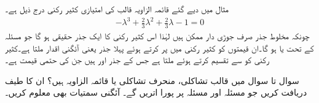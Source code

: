 مثال  میں دیے گئے قائمہ الزاویہ قالب کی امتیازی کثیر رکنی درج ذیل ہے۔
\begin{align*}
-\lambda^3+\frac{2}{3}\lambda^2+\frac{2}{3}\lambda-1=0
\end{align*} 
چونکہ مخلوط جذر صرف جوڑی دار ممکن ہیں لہٰذا اس کثیر رکنی کا ایک جذر حقیقی ہو گا جو مسئلہ  کے تحت  یا  ہو گا۔ان قیمتوں کو کثیر رکنی میں پر کرتے ہوئے پہلا جذر یعنی آئگنی اقدار  ملتا ہے۔کثیر رکنی کو  سے تقسیم کرتے ہوئے  ملتا ہے جس کے جذر   اور  ہیں جن کی حتمی قیمت  ہے۔

سوال  تا سوال  میں قالب تشاکلی، منحرف تشاکلی یا قائمہ الزاویہ ہیں؟ ان کا طیف  دریافت کریں جو مسئلہ  اور مسئلہ  پر پورا اتریں گے۔ آئگنی سمتیات بھی معلوم کریں۔

